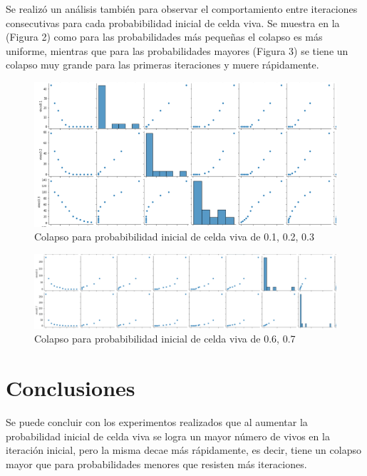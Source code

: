 \documentclass{article}
\begin{document}
Se realizó un análisis también para observar el comportamiento entre iteraciones consecutivas para cada probabibilidad inicial de celda viva. Se muestra en la (Figura 2) como para las probabilidades más pequeñas el colapso es más uniforme, mientras que para las probabilidades mayores (Figura 3)  se tiene un colapso muy grande para las primeras iteraciones y muere rápidamente. 

\begin{figure}[H]
	\centering
	
	\includegraphics[scale=0.5]{captura2.png}
	\caption{Colapso para probabibilidad inicial de celda viva de 0.1, 0.2, 0.3}
	\label{fig:f2}
\end{figure}

\begin{figure}[H]
	\centering
	
	\includegraphics[scale=0.5]{Captura3.png}
	\caption{Colapso para probabibilidad inicial de celda viva de 0.6, 0.7}
	\label{fig:f3}
\end{figure}
 
\section{Conclusiones}
Se puede concluir con los experimentos realizados que al aumentar la probabilidad inicial de celda viva se logra un mayor número de vivos en la iteración inicial, pero la misma decae más rápidamente, es decir, tiene un colapso mayor que para probabilidades menores que resisten más iteraciones. 



\end{document}

